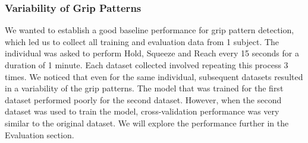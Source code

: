 \subsubsection{Variability of Grip Patterns}
We wanted to establish a good baseline performance for grip pattern detection, which led us to collect all training and evaluation data from 1 subject. The individual was asked to perform Hold, Squeeze and Reach every 15 seconds for a duration of 1 minute. Each dataset collected involved repeating this process  3 times. We noticed that even for the same individual, subsequent datasets resulted in a variability of the grip patterns. The model that was trained for the first dataset performed poorly for the second dataset. However, when the second dataset was used to train the model, cross-validation performance was very similar to the original dataset. We will explore the performance further in the Evaluation section.  

